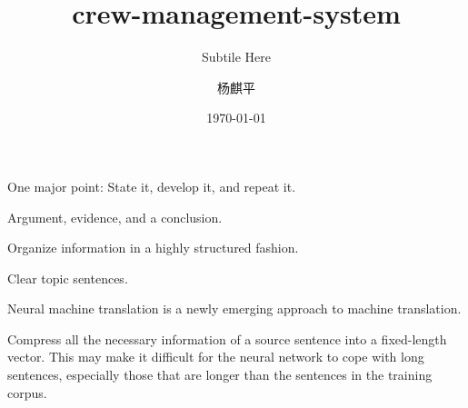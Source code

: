 \documentclass{beamer}
\title{crew-management-system}
\subtitle{Subtile Here}
\author{杨麒平}
\institute{}
\date{\today}
\begin{document}

\begin{frame}
  \titlepage
\end{frame}

\begin{frame}
  One major point: State it, develop it, and repeat it.

  Argument, evidence, and a conclusion.

  Organize information in a highly structured fashion.

  Clear topic sentences.
  
  Neural machine translation is a newly emerging approach to machine translation.

  Compress all the necessary information of a source sentence into a
  fixed-length vector. This may make it difficult for the neural network to cope
  with long sentences, especially those that are longer than the sentences in
  the training corpus.

  
\end{frame}
\end{document}

